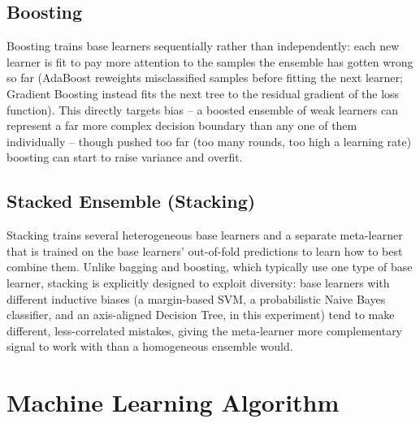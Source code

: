 \documentclass[11pt,a4paper]{article}
\begin{document}
\subsection{Boosting}
Boosting trains base learners sequentially rather than independently: each new learner is fit to pay more attention to the samples the ensemble has gotten wrong so far (AdaBoost reweights misclassified samples before fitting the next learner; Gradient Boosting instead fits the next tree to the residual gradient of the loss function). This directly targets bias -- a boosted ensemble of weak learners can represent a far more complex decision boundary than any one of them individually -- though pushed too far (too many rounds, too high a learning rate) boosting can start to raise variance and overfit.

\subsection{Stacked Ensemble (Stacking)}
Stacking trains several heterogeneous base learners and a separate meta-learner that is trained on the base learners' out-of-fold predictions to learn how to best combine them. Unlike bagging and boosting, which typically use one type of base learner, stacking is explicitly designed to exploit diversity: base learners with different inductive biases (a margin-based SVM, a probabilistic Naive Bayes classifier, and an axis-aligned Decision Tree, in this experiment) tend to make different, less-correlated mistakes, giving the meta-learner more complementary signal to work with than a homogeneous ensemble would.

\section{Machine Learning Algorithm}
\end{document}

